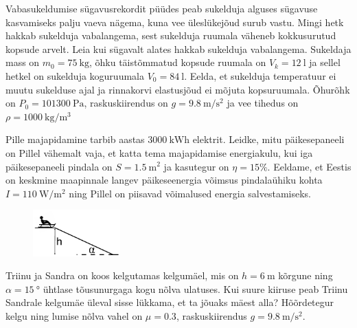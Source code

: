 \documentclass[10pt]{article}
\begin{document}

Vabasukeldumise sügavusrekordit püüdes peab sukelduja alguses sügavuse kasvamiseks palju vaeva nägema, kuna vee üleslükejõud surub vastu. Mingi hetk hakkab sukelduja vabalangema, sest sukelduja ruumala väheneb kokkusurutud kopsude arvelt. Leia kui sügavalt alates hakkab sukelduja vabalangema. Sukeldaja mass on $m_0 = \SI{75}{\kg}$, õhku täistõmmatud kopsude ruumala on $V_{k} = \SI{12}{\l}$ ja sellel hetkel on sukelduja koguruumala $V_0 = \SI{84}{\l}$. Eelda, et sukelduja temperatuur ei muutu sukelduse ajal ja rinnakorvi elastusjõud ei mõjuta kopsuruumala. Õhurõhk on $P_0 = \SI{101300}{\Pa}$, raskuskiirendus on $g = \SI{9.8}{\m\per\s\squared}$ ja vee tihedus on $\rho = \SI{1000}{\kg\per\m\cubed}$
\probend
\bigskip


Pille majapidamine tarbib aastas $\SI{3000}{\kWh}$ elektrit. Leidke, mitu päikesepaneeli on Pillel vähemalt vaja, et katta tema majapidamise energiakulu, kui iga päikesepaneeli pindala on $S = \SI{1.5}{\m\squared}$ ja kasutegur on $\eta = 15\%$. Eeldame, et Eestis on keskmine maapinnale langev päikeseenergia võimsus pindalaühiku kohta $I = \SI{110}{\W\per\m\squared}$ ning Pillel on piisavad võimalused energia salvestamiseks.
\probend
\bigskip


\begin{figure}
  \vspace*{-5mm}
    \includegraphics[width=0.3\textwidth]{2024-v3g-01-yl.pdf}
\end{figure}
Triinu ja Sandra on koos kelgutamas kelgumäel, mis on $h=\SI{6}{\m}$ kõrgune ning $\alpha=\SI{15}{\degree}$ ühtlase tõusunurgaga kogu nõlva ulatuses. Kui suure kiiruse peab Triinu Sandrale kelgumäe üleval sisse lükkama, et ta jõuaks mäest alla? Hõõrdetegur kelgu ning lumise nõlva vahel on $\mu=\num{0.3}$, raskuskiirendus $g=\SI{9.8}{\m\per\s\squared}$.
\probend
\bigskip
\end{document}
